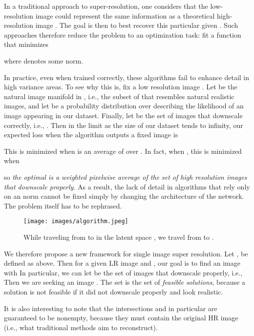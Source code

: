 \documentclass[10pt,twocolumn,letterpaper]{article}
\begin{document}
In a traditional approach to super-resolution, one considers that the low-resolution image could represent the same information as a theoretical high-resolution image . The goal is then to best recover this particular  given . Such approaches therefore reduce the problem to an optimization task: fit a function  that minimizes

where  denotes some  norm. 

In practice, even when trained correctly, these algorithms fail to enhance detail in high variance areas. To see why this is, fix a low resolution image . Let  be the natural image manifold in , i.e., the subset of  that resembles natural realistic images, and let  be a probability distribution over  describing the likelihood of an image appearing in our dataset. Finally, let  be the set of images that downscale correctly, i.e., . Then in the limit as the size of our dataset tends to infinity, our expected loss when the algorithm outputs a fixed image  is

This is minimized when  is an  average of  over . In fact, when , this is minimized when

so \textit{the optimal  is a weighted pixelwise average of the set of high resolution images that downscale properly}. As a result, the lack of detail in algorithms that rely only on an  norm cannot be fixed simply by changing the architecture of the network. The problem itself has to be rephrased.
\begin{figure}[!t]
    \centering
    \texttt{[image: images/algorithm.jpeg]}
    \caption{While traveling from  to  in the latent space , we travel from  to .}
    \label{fig:algorithm}
\end{figure}

We therefore propose a new framework for single image super resolution. Let ,  be defined as above. Then for a given LR image  and , our goal is to find an image  with
 In particular, we can let  be the set of images that downscale properly, i.e.,
 Then we are seeking an image . The set  is the set of \textit{feasible solutions}, because a solution is not feasible if it did not downscale properly and look realistic.

It is also interesting to note that the intersections  and in particular  are guaranteed to be nonempty, because they must contain the original HR image (i.e., what traditional methods aim to reconstruct).
\end{document}
